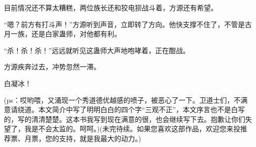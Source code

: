 \begin{this_body}
目前情况还不算太糟糕，两位族长还和狡电狈战斗着，方源还有希望。

“嗯？前方有打斗声！”方源听到声音，立即转了方向。他快支撑不住了，不管是古月一族，还是白家蛊师，对他都有利。

“杀！杀！杀！”远远就听见这蛊师大声地咆哮着，正在酣战。

方源疾奔过去，冲势忽然一滞。

白凝冰！

(ps：哎哟喂，又涌现一个秀道德优越感的喷子，被恶心了一下。卫道士们，不满意请绕道。本文简介中写了明明白白的四个字“三观不正”，本文序言也不是白写的，写的清清楚楚。这本书我写到现在满意的很，也会继续写下去。抱歉让你们失望了，我是不会太监的。呵呵。)(未完待续。如果您喜欢这部作品，欢迎您来投推荐票、月票，您的支持，就是我最大的动力。)

\end{this_body}

